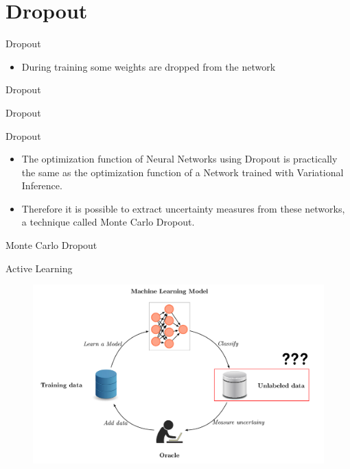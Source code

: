 \documentclass[10pt]{beamer}
\begin{document}
\section{Dropout}

\begin{frame}[fragile]{Dropout}
\begin{itemize}
\item During training some weights are dropped from the network
\end{itemize}
\end{frame}

\begin{frame}[fragile]{Dropout}
    
\end{frame}

\begin{frame}[fragile]{Dropout}
    
\end{frame}

\begin{frame}[fragile]{Dropout}
\begin{itemize}
    \item The optimization function of Neural Networks using \alert{Dropout} is practically the same
        as the optimization function of a Network trained with Variational
        Inference.
    \vspace{0.5cm}
    \item Therefore it is possible to extract uncertainty measures from these
        networks, a technique called \alert{Monte Carlo Dropout}.
\end{itemize}
\end{frame}

\begin{frame}[fragile]{Monte Carlo Dropout}
    
\end{frame}

\begin{frame}[fragile]{Active Learning}
    \begin{figure}[htp]
        \centering
        \includegraphics[scale=0.3]{images/active_learning_uncertainty.png}
    \end{figure}
\end{frame}
\end{document}
